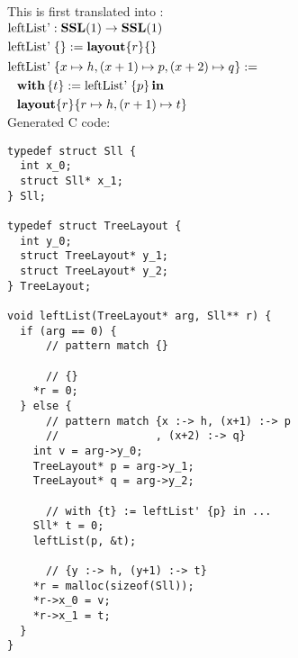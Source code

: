 %
%
%
%

\noindent
This is first translated into \PikaCore:
\\

$\begin{aligned}
  &\textrm{leftList'} : \textbf{SSL}(1) \rightarrow \textbf{SSL}(1)\\
  &\textrm{leftList'}\; \{\} := \textbf{layout}\{ r \}\{  \}\\
  &\begin{aligned}
    \textrm{le}&\textrm{ftList'}\; \{x \mapsto h, (x+1) \mapsto p, (x+2) \mapsto q\} :=\\
      &\textbf{with}\,\{t\} := \textrm{leftList'}\; \{p\}\,\textbf{in}\,\\
      &\textbf{layout}\{ r \}\{ r \mapsto h, (r+1) \mapsto t \}
   \end{aligned}
\end{aligned}$
\\


\noindent
Generated C code:

\begin{lstlisting}
typedef struct Sll {
  int x_0;
  struct Sll* x_1;
} Sll;

typedef struct TreeLayout {
  int y_0;
  struct TreeLayout* y_1;
  struct TreeLayout* y_2;
} TreeLayout;

void leftList(TreeLayout* arg, Sll** r) {
  if (arg == 0) {
      // pattern match {}

      // {}
    *r = 0;
  } else {
      // pattern match {x :-> h, (x+1) :-> p
      //               , (x+2) :-> q}
    int v = arg->y_0;
    TreeLayout* p = arg->y_1;
    TreeLayout* q = arg->y_2;

      // with {t} := leftList' {p} in ...
    Sll* t = 0;
    leftList(p, &t);

      // {y :-> h, (y+1) :-> t}
    *r = malloc(sizeof(Sll));
    *r->x_0 = v;
    *r->x_1 = t;
  }
}
\end{lstlisting}

